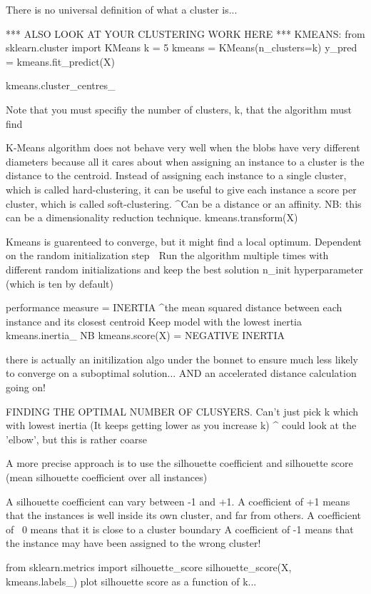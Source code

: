 There is no universal definition of what a cluster is...

*** ALSO LOOK AT YOUR CLUSTERING WORK HERE ***
KMEANS:
from sklearn.cluster import KMeans
k = 5
kmeans = KMeans(n_clusters=k)
y_pred = kmeans.fit_predict(X)

kmeans.cluster_centres_

Note that you must specifiy the number of clusters, k, that the algorithm must find

K-Means algorithm does not behave very well when the blobs have very different diameters because all it cares about
when assigning an instance to a cluster is the distance to the centroid.
Instead of assigning each instance to a single cluster, which is called hard-clustering,
it can be useful to give each instance a score per cluster, which is called soft-clustering.
^Can be a distance or an affinity. NB: this can be a dimensionality reduction technique.
kmeans.transform(X)

Kmeans is guarenteed to converge, but it might find a local optimum.
Dependent on the random initialization step
^^^ Run the algorithm multiple times with different random initializations and keep the best solution
n_init hyperparameter (which is ten by default)

performance measure = INERTIA
^the mean squared distance between each instance and its closest centroid
Keep model with the lowest inertia
kmeans.inertia_
NB kmeans.score(X) = NEGATIVE INERTIA

there is actually an initilization algo under the bonnet
to ensure much less likely to converge on a suboptimal solution...
AND an accelerated distance calculation going on!

FINDING THE OPTIMAL NUMBER OF CLUSYERS.
Can't just pick k which with lowest inertia
(It keeps getting lower as you increase k)
^ could look at the 'elbow', but this is rather coarse

A more precise approach is to use the silhouette coefficient
and silhouette score (mean silhouette coefficient over all instances)

A silhouette coefficient can vary between -1 and +1.
A coefficient of +1 means that the instances is well inside its own cluster, and far from others.
A coefficient of ~0 means that it is close to a cluster boundary
A coefficient of -1 means that the instance may have been assigned to the wrong cluster!

from sklearn.metrics import silhouette_score
silhouette_score(X, kmeans.labels_)
plot silhouette score as a function of k...

